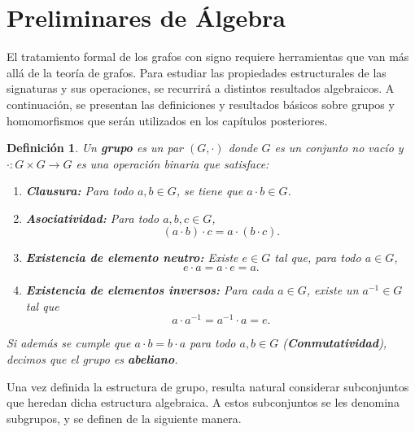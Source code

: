 \documentclass[11pt,a4paper,spanish]{report}
\theoremstyle{plain}
\newtheorem{definicion}{Definición}[chapter]
\begin{document}
\section{Preliminares de Álgebra}
El tratamiento formal de los grafos con signo requiere herramientas que van más allá de la teoría de grafos. Para estudiar las propiedades estructurales de las signaturas y sus operaciones, se recurrirá a distintos resultados algebraicos. A continuación, se presentan las definiciones y resultados básicos sobre grupos y homomorfismos que serán utilizados en los capítulos posteriores.

\begin{definicion}\cite{dummit2004abstract}\label{Grupo Abeliano}
Un \textbf{grupo} es un par $(G,\cdot)$ donde $G$ es un conjunto no vacío y 
$\cdot : G \times G \to G$ es una operación binaria que satisface:

\begin{enumerate}
    \item[(i)] \textbf{Clausura:} Para todo $a,b \in G$, se tiene que $a \cdot b \in G$.
    \item[(ii)] \textbf{Asociatividad:} Para todo $a,b,c \in G$,
    \[
        (a \cdot b)\cdot c = a \cdot (b \cdot c).
    \]
    \item[(iii)] \textbf{Existencia de elemento neutro:} Existe $e \in G$ tal que, para todo $a \in G$,
    \[
        e \cdot a = a \cdot e = a.
    \]
    \item[(iv)] \textbf{Existencia de elementos inversos:} Para cada $a \in G$, existe un $a^{-1} \in G$ tal que
    \[
        a \cdot a^{-1} = a^{-1} \cdot a = e.
    \]
\end{enumerate}

Si además se cumple que $a \cdot b = b \cdot a$ para todo $a,b \in G$ (\textbf{Conmutatividad}), 
decimos que el grupo es \textbf{abeliano}.
\end{definicion}

Una vez definida la estructura de grupo, resulta natural considerar subconjuntos que 
heredan dicha estructura algebraica. A estos subconjuntos se les denomina 
subgrupos, y se definen de la siguiente manera.
\end{document}
